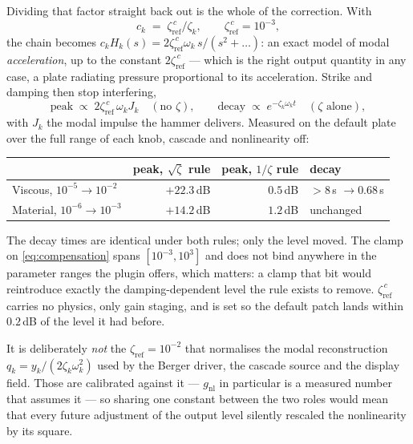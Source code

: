 \documentclass[11pt,a4paper]{article}
\begin{document}
Dividing that factor straight back out is the whole of the correction. With
%
\begin{equation}
  c_k \;=\; \zeta^{\,c}_{\mathrm{ref}}/\zeta_k ,
  \qquad \zeta^{\,c}_{\mathrm{ref}} = 10^{-3},
  \label{eq:compensation}
\end{equation}
%
the chain becomes $c_k H_k(s) = 2\zeta^{\,c}_{\mathrm{ref}}\omega_k\,s/(s^2
+ \ldots)$: an exact model of modal \emph{acceleration}, up to the constant
$2\zeta^{\,c}_{\mathrm{ref}}$ --- which is the right output quantity in any
case, a plate radiating pressure proportional to its acceleration. Strike
and damping then stop interfering,
%
\begin{equation}
  \text{peak} \;\propto\; 2\zeta^{\,c}_{\mathrm{ref}}\,\omega_k J_k
  \quad(\text{no } \zeta),
  \qquad
  \text{decay} \;\propto\; e^{-\zeta_k \omega_k t}
  \quad(\zeta \text{ alone}),
  \label{eq:peaklaw}
\end{equation}
%
with $J_k$ the modal impulse the hammer delivers. Measured on the default
plate over the full range of each knob, cascade and nonlinearity off:
%
\begin{center}
\begin{tabular}{lrrl}
\toprule
& peak, $\sqrt{\zeta}$ rule & peak, $1/\zeta$ rule & decay \\
\midrule
Viscous, $10^{-5} \to 10^{-2}$   & $+22.3$\,dB & $0.5$\,dB & $>8\,$s $\to 0.68\,$s \\
Material, $10^{-6} \to 10^{-3}$  & $+14.2$\,dB & $1.2$\,dB & unchanged \\
\bottomrule
\end{tabular}
\end{center}
%
The decay times are identical under both rules; only the level moved. The
clamp on \eqref{eq:compensation} spans $[10^{-3}, 10^{3}]$ and does not bind
anywhere in the parameter ranges the plugin offers, which matters: a clamp
that bit would reintroduce exactly the damping-dependent level the rule
exists to remove. $\zeta^{\,c}_{\mathrm{ref}}$ carries no physics, only gain
staging, and is set so the default patch lands within $0.2$\,dB of the level
it had before.

It is deliberately \emph{not} the $\zeta_{\mathrm{ref}} = 10^{-2}$ that
normalises the modal reconstruction $q_k = y_k/(2\zeta_k\omega_k^2)$ used by
the Berger driver, the cascade source and the display field. Those are
calibrated against it --- $g_{\mathrm{nl}}$ in particular is a measured
number that assumes it --- so sharing one constant between the two roles
would mean that every future adjustment of the output level silently
rescaled the nonlinearity by its square.
\end{document}
